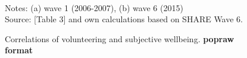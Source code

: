 \documentclass[10pt, letterpaper]{article}
\begin{document}
\begin{spacing}{1.4}
\begin{figure}[H]
\centering
\caption{Correlations of volunteering and subjective wellbeing.  \textbf{popraw format}} 
\label{fig:taub}
\begin{minipage}{1\linewidth}
\quad
{}~\\
{\footnotesize Notes: (a) wave 1 (2006-2007), (b) wave 6 (2015) }~\\
{\footnotesize Source: \citet{haski09} [Table 3] and own calculations based on SHARE Wave 6.}
\end{minipage}
\end{figure} 

%



\end{spacing}
\end{document}
